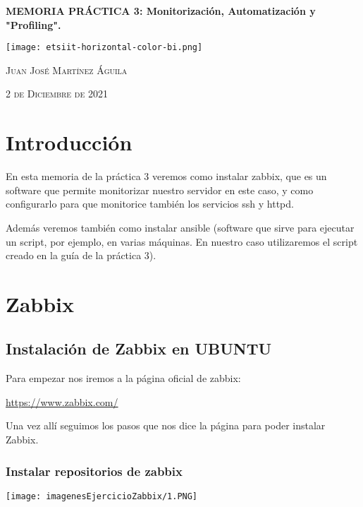 \documentclass[a4paper, 12pt]{article}
\begin{document}
\begin{titlepage}    
\centering
{\bfseries\LARGE MEMORIA PRÁCTICA 3: Monitorización, Automatización y "Profiling". \par}
\vspace{9.5cm}
\texttt{[image: etsiit-horizontal-color-bi.png]}

\begin{flushleft}
{\scshape \large Juan José Martínez Águila \par}
{\scshape \large 2 de Diciembre de 2021 \par}
\end{flushleft}
\end{titlepage}


\newpage
\tableofcontents

\flushleft

\newpage
\section{\Large Introducción}
\begin{justify}
{En esta memoria de la práctica 3 veremos como instalar zabbix, que es un software que permite monitorizar nuestro servidor en este caso, y como configurarlo para que monitorice también los  servicios ssh y httpd. \par
Además veremos también como instalar ansible (software que sirve para ejecutar un script, por ejemplo, en varias máquinas. En nuestro caso utilizaremos el script creado en la guía de la práctica 3).}
\end{justify}
\section{\Large Zabbix}
\subsection{Instalación de Zabbix en UBUNTU}
{Para empezar nos iremos a la página  oficial de zabbix: \par}
\url{https://www.zabbix.com/}
\vspace{0.2cm}
{\par Una vez allí seguimos los pasos que nos dice la página para poder instalar Zabbix. \par}
\subsubsection{Instalar repositorios de zabbix}
\texttt{[image: imagenesEjercicioZabbix/1.PNG]}
\end{document}
